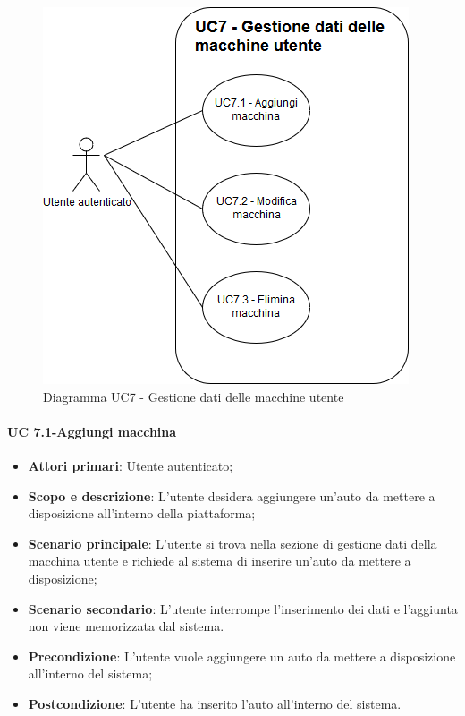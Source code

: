        
     \begin{figure}[h!]
           \begin{center}
           \includegraphics[scale=0.50]{immagini/7.png} 
           \caption{Diagramma UC7 - Gestione dati delle macchine utente}
           \end{center}
        \end{figure}
        
        \newpage
                 
                 \paragraph{UC 7.1-Aggiungi macchina}
                 \begin{itemize}
                \item \textbf{Attori primari}: Utente autenticato;
                
                 \item \textbf{Scopo e descrizione}: L'utente desidera aggiungere un'auto da mettere a disposizione all'interno della piattaforma;
                 \item \textbf{Scenario principale}: L'utente si trova nella sezione di gestione dati della macchina utente e richiede al sistema di inserire un'auto da mettere a disposizione;
                 \item \textbf{Scenario secondario}: L'utente interrompe l'inserimento dei dati e l'aggiunta non viene memorizzata dal sistema.
                
                
                 \item \textbf{Precondizione}: L'utente vuole aggiungere un auto da mettere a disposizione all'interno del sistema;
                 \item \textbf{Postcondizione}: L'utente ha inserito l'auto all'interno del sistema.
                 \end{itemize}
                 
